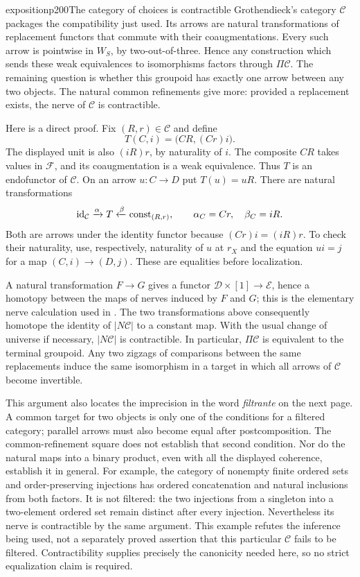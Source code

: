 \begin{dcomment}{exposition}{p200}{The category of choices is contractible}
Grothendieck's category $\mathcal C$ packages the compatibility just used. Its arrows are natural transformations of replacement functors that commute with their coaugmentations. Every such arrow is pointwise in $W_S$, by two-out-of-three. Hence any construction which sends these weak equivalences to isomorphisms factors through $\Pi\mathcal C$. The remaining question is whether this groupoid has exactly one arrow between any two objects. The natural common refinements give more: provided a replacement exists, the nerve of $\mathcal C$ is contractible.

Here is a direct proof. Fix $(R,r)\in\mathcal C$ and define
\[
 T(C,i)=\bigl(CR,(Cr)i\bigr).
\]
The displayed unit is also $(iR)r$, by naturality of $i$. The composite $CR$ takes values in $\mathcal F$, and its coaugmentation is a weak equivalence. Thus $T$ is an endofunctor of $\mathcal C$. On an arrow $u:C\to D$ put $T(u)=uR$. There are natural transformations
\[
 \mathrm{id}_{\mathcal C}\xrightarrow{\alpha}T
       \xleftarrow{\beta}\operatorname{const}_{(R,r)},
 \qquad \alpha_C=Cr,\quad\beta_C=iR.
\]
Both are arrows under the identity functor because $(Cr)i=(iR)r$. To check their naturality, use, respectively, naturality of $u$ at $r_X$ and the equation $ui=j$ for a map $(C,i)\to(D,j)$. These are equalities before localization.

A natural transformation $F\to G$ gives a functor $\mathcal D\times[1]\to\mathcal E$, hence a homotopy between the maps of nerves induced by $F$ and $G$; this is the elementary nerve calculation used in \citet[\S1, Proposition~2]{Quillen1973}. The two transformations above consequently homotope the identity of $|N\mathcal C|$ to a constant map. With the usual change of universe if necessary, $|N\mathcal C|$ is contractible. In particular, $\Pi\mathcal C$ is equivalent to the terminal groupoid. Any two zigzags of comparisons between the same replacements induce the same isomorphism in a target in which all arrows of $\mathcal C$ become invertible.

This argument also locates the imprecision in the word \emph{filtrante} on the next page. A common target for two objects is only one of the conditions for a filtered category; parallel arrows must also become equal after postcomposition. The common-refinement square does not establish that second condition. Nor do the natural maps into a binary product, even with all the displayed coherence, establish it in general. For example, the category of nonempty finite ordered sets and order-preserving injections has ordered concatenation and natural inclusions from both factors. It is not filtered: the two injections from a singleton into a two-element ordered set remain distinct after every injection. Nevertheless its nerve is contractible by the same argument. This example refutes the inference being used, not a separately proved assertion that this particular $\mathcal C$ fails to be filtered. Contractibility supplies precisely the canonicity needed here, so no strict equalization claim is required.
\end{dcomment}



